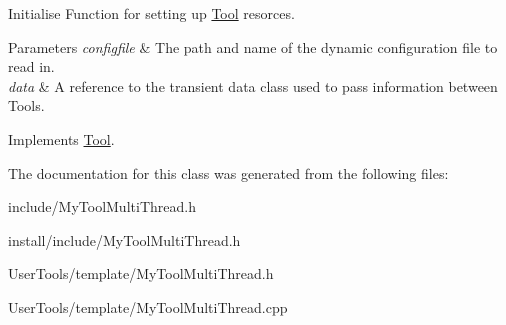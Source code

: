Initialise Function for setting up \hyperlink{classTool}{Tool} resorces. 


\begin{DoxyParams}{Parameters}
{\em configfile} & The path and name of the dynamic configuration file to read in. \\
\hline
{\em data} & A reference to the transient data class used to pass information between Tools. \\
\hline
\end{DoxyParams}


Implements \hyperlink{classTool_a4b04a99172dfe09dc97927d1feaff0ce}{Tool}.



The documentation for this class was generated from the following files\-:\begin{DoxyCompactItemize}
\item 
include/My\-Tool\-Multi\-Thread.\-h\item 
install/include/My\-Tool\-Multi\-Thread.\-h\item 
User\-Tools/template/My\-Tool\-Multi\-Thread.\-h\item 
User\-Tools/template/My\-Tool\-Multi\-Thread.\-cpp\end{DoxyCompactItemize}

